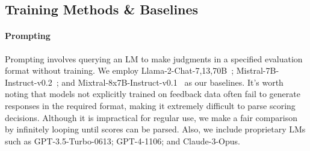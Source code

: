 \documentclass[11pt]{article}
\begin{document}
\begin{table}[t]
    \centering
    \fontsize{6}{8}
    \caption{Statistics of our evaluation benchmarks to assess the evaluation capabilities of evaluator LMs.}
    \label{tab:eval-sets}
\end{table}


\subsection{Training Methods \& Baselines}\label{unified_training}

\paragraph{Prompting} Prompting involves querying an LM to make judgments in a specified evaluation format without training. We employ Llama-2-Chat-{7,13,70}B~\citep{touvron2023llama2}; Mistral-7B-Instruct-v0.2~\citep{jiang2023mistral}; and Mixtral-8x7B-Instruct-v0.1~\citep{jiang2024mixtral} as our baselines. It's worth noting that models not explicitly trained on feedback data often fail to generate responses in the required format, making it extremely difficult to parse scoring decisions. Although it is impractical for regular use, we make a fair comparison by infinitely looping until scores can be parsed. Also, we include proprietary LMs such as GPT-3.5-Turbo-0613; GPT-4-1106; and Claude-3-Opus.
\end{document}
